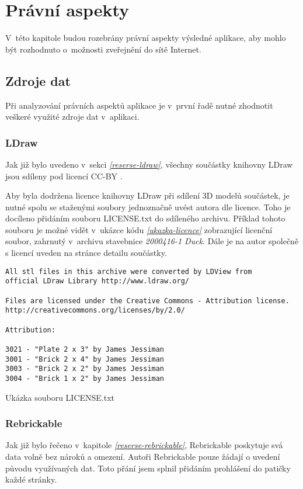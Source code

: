 \chapter{Právní aspekty} 
V~této kapitole budou rozebrány právní aspekty výsledné aplikace, aby mohlo být rozhodnuto o~možnosti zveřejnění do sítě Internet. 

\section{Zdroje dat}
Při analyzování právních aspektů aplikace je v~první řadě nutné zhodnotit veškeré využité zdroje dat v~aplikaci. 

\subsection{LDraw}
Jak již bylo uvedeno v~sekci \emph{\ref{reserse-ldraw}}, všechny součástky knihovny LDraw jsou sdíleny pod licencí \gls{CC-BY} \autocite{CC-BY}.

Aby byla dodržena licence knihovny LDraw při sdílení 3D modelů součástek, je nutné spolu se staženými soubory jednoznačně uvést autora dle licence. Toho je docíleno přidáním souboru LICENSE.txt do sdíleného archivu. Příklad tohoto souboru je možné vidět v~ukázce kódu \emph{\ref{ukazka-licence}} zobrazující licenční soubor, zahrnutý v~archivu stavebnice \textit{2000416-1 Duck}. Dále je na autor společně s licencí uveden na stránce detailu součástky.

\begin{listing}[htbp]
        \begin{verbatim}
All stl files in this archive were converted by LDView from 
official LDraw Library http://www.ldraw.org/

Files are licensed under the Creative Commons - Attribution license.
http://creativecommons.org/licenses/by/2.0/

Attribution:

3021 - "Plate 2 x 3" by James Jessiman
3001 - "Brick 2 x 4" by James Jessiman
3003 - "Brick 2 x 2" by James Jessiman
3004 - "Brick 1 x 2" by James Jessiman
        \end{verbatim}
    \caption{Ukázka souboru LICENSE.txt\label{ukazka-licence}}
\end{listing}

\subsection{Rebrickable}
Jak již bylo řečeno v~kapitole \emph{\ref{reserse-rebrickable}}, Rebrickable poskytuje svá data volně bez nároků a omezení. Autoři Rebrickable pouze žádají o uvedení původu využívaných dat. Toto přání jsem splnil přidáním prohlášení do patičky každé stránky.

